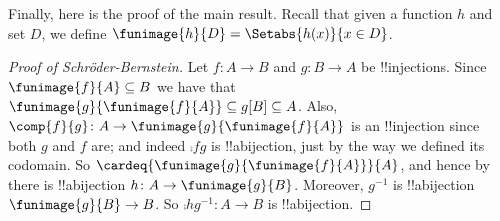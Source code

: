 Finally, here is the proof of the main result. Recall that given a
function $h$ and set $D$, we define $\funimage{h}{D} = \Setabs{h(x)}{x
\in D}$. 

\begin{proof}[Proof of Schr\"oder-Bernstein] Let $f \colon A \to B$
and $g \colon B \to A$ be !!{injection}s. Since $\funimage{f}{A}
\subseteq B$ we have that $\funimage{g}{\funimage{f}{A}} \subseteq
g[B] \subseteq A$. Also, $\comp{f}{g} \colon A \to
\funimage{g}{\funimage{f}{A}}$ is an !!{injection} since both $g$ and
$f$ are; and indeed $\comp{f}{g}$ is !!a{bijection}, just by the way
we defined its codomain. So
$\cardeq{\funimage{g}{\funimage{f}{A}}}{A}$, and hence by
 there is !!a{bijection} $h \colon A \to
\funimage{g}{B}$. Moreover, $g^{-1}$ is !!a{bijection}
$\funimage{g}{B} \to B$. So $\comp{h}{g^{-1}} \colon A \to B$ is
!!a{bijection}. 
\end{proof}





\OLEndPartHook
